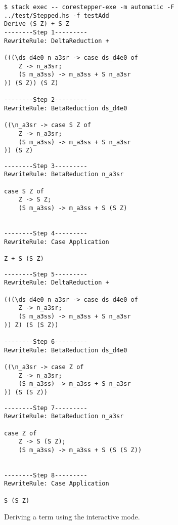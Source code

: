\begin{figure}[!ht]
\begin{verbatim}
$ stack exec -- corestepper-exe -m automatic -F ../test/Stepped.hs -f testAdd
Derive (S Z) + S Z
--------Step 1---------
RewriteRule: DeltaReduction +

(((\ds_d4e0 n_a3sr -> case ds_d4e0 of
    Z -> n_a3sr;
    (S m_a3ss) -> m_a3ss + S n_a3sr
)) (S Z)) (S Z)

--------Step 2---------
RewriteRule: BetaReduction ds_d4e0

((\n_a3sr -> case S Z of
    Z -> n_a3sr;
    (S m_a3ss) -> m_a3ss + S n_a3sr
)) (S Z)
\end{verbatim}
\end{figure}
\begin{figure}[!ht]
\begin{verbatim}
--------Step 3---------
RewriteRule: BetaReduction n_a3sr

case S Z of
    Z -> S Z;
    (S m_a3ss) -> m_a3ss + S (S Z)


--------Step 4---------
RewriteRule: Case Application

Z + S (S Z)
\end{verbatim}
\end{figure}
\begin{figure}[!ht]
\begin{verbatim}
--------Step 5---------
RewriteRule: DeltaReduction +

(((\ds_d4e0 n_a3sr -> case ds_d4e0 of
    Z -> n_a3sr;
    (S m_a3ss) -> m_a3ss + S n_a3sr
)) Z) (S (S Z))

--------Step 6---------
RewriteRule: BetaReduction ds_d4e0

((\n_a3sr -> case Z of
    Z -> n_a3sr;
    (S m_a3ss) -> m_a3ss + S n_a3sr
)) (S (S Z))
\end{verbatim}
\end{figure}
\begin{figure}[!ht]
\begin{verbatim}
--------Step 7---------
RewriteRule: BetaReduction n_a3sr

case Z of
    Z -> S (S Z);
    (S m_a3ss) -> m_a3ss + S (S (S Z))


--------Step 8---------
RewriteRule: Case Application

S (S Z)
\end{verbatim}
    \caption{Deriving a term using the interactive mode.}
    \label{fig:FR4example1}
\end{figure}

